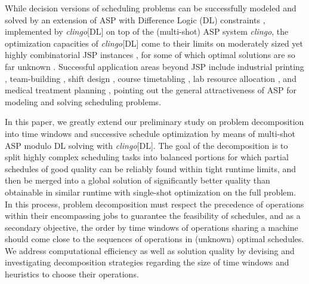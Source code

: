 \documentclass{tlp} %
\newcommand{\clingo}{\emph{clingo}\xspace}
\newcommand{\clingodl}{\emph{clingo}[DL]\xspace}
\begin{document}
While decision versions of scheduling problems can be successfully modeled and
solved by an extension of ASP with Difference Logic (DL) constraints
\citep{gebser2016theory}, implemented by \clingodl on top of the
(multi-shot) ASP system \clingo \citep{gekakasc17a},
the optimization capacities of \clingodl come to their limits on moderately sized
yet highly combinatorial JSP instances \citep{elkgeb20a}, for some of which optimal solutions are so far unknown \citep{shysha18a}.
Successful application areas beyond JSP include 
industrial printing \citep{balduccini11a},
team-building \citep{rigralmaliiile12a},
shift design \citep{abseher2016shift},
course timetabling \citep{bainkaokscsotawa18a},
lab resource allocation \citep{francescutto2021solving},
and
medical treatment planning \citep{dogagrmamopo21a},
pointing out the general attractiveness of ASP for modeling and solving scheduling problems.

In this paper, we greatly extend our preliminary study \citep{elkgeb20a} 
on problem decomposition into time windows and successive schedule optimization
by means of multi-shot ASP modulo DL solving with \clingodl.
The goal of the decomposition is to split highly complex scheduling tasks into
balanced portions for which partial schedules of good quality can be reliably
found within tight runtime limits, and then be merged into a global solution of
significantly better quality than obtainable in similar runtime 
with single-shot optimization on the full problem.
In this process, problem decomposition must respect the precedence of operations
within their encompassing jobs to guarantee the feasibility of schedules, and as
a secondary objective, the order by time windows of operations sharing a machine should come close to the sequences of operations in (unknown) optimal schedules.
We address computational efficiency as well as solution quality by devising and investigating decomposition strategies regarding the size of
time windows and heuristics to choose their operations.
\end{document}
